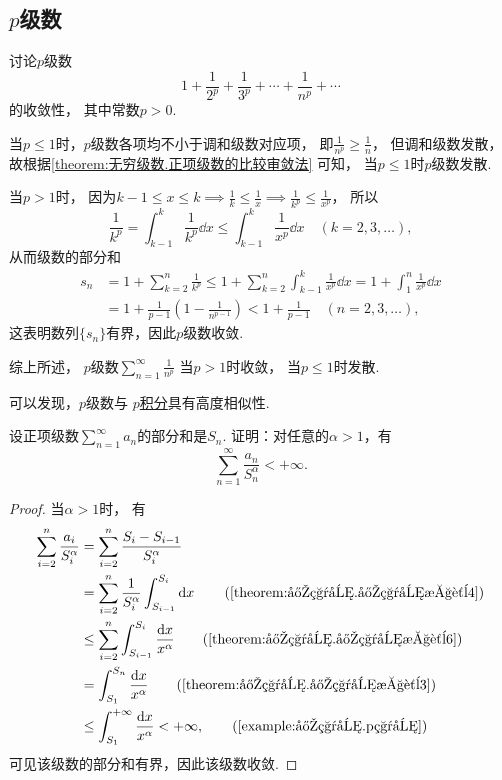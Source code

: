 \subsection{\texorpdfstring{\(p\)}{p}级数}
\begin{proposition}\label{example:无穷级数.p级数的收敛性}
讨论\(p\)级数\[
	1+\frac{1}{2^p}+\frac{1}{3^p}+\dotsb+\frac{1}{n^p}+\dotsb
\]的收敛性，
其中常数\(p>0\).
\begin{solution}
当\(p \leq 1\)时，\(p\)级数各项均不小于调和级数对应项，
即\(\frac{1}{n^p} \geq \frac{1}{n}\)，
但调和级数发散，
故根据\cref{theorem:无穷级数.正项级数的比较审敛法} 可知，
当\(p \leq 1\)时\(p\)级数发散.

当\(p > 1\)时，
因为\(k-1
\leq x
\leq k \implies \frac{1}{k}
\leq \frac{1}{x} \implies \frac{1}{k^p}
\leq \frac{1}{x^p}\)，
所以\[
	\frac{1}{k^p}
	= \int_{k-1}^k \frac{1}{k^p} \dd{x}
	\leq \int_{k-1}^k \frac{1}{x^p} \dd{x}
	\quad(k=2,3,\dotsc),
\]
从而级数的部分和
\begin{align*}
	s_n &= 1 + \sum_{k=2}^n{\frac{1}{k^p}}
	\leq 1 + \sum_{k=2}^n{ \int_{k-1}^k{\frac{1}{x^p}\dd{x}} }
	= 1 + \int_1^n{\frac{1}{x^p}\dd{x}} \\
	&= 1 + \frac{1}{p-1}\left(1-\frac{1}{n^{p-1}}\right)
	< 1 + \frac{1}{p-1}
	\quad(n=2,3,\dotsc),
\end{align*}
这表明数列\(\{s_n\}\)有界，因此\(p\)级数收敛.

综上所述，{\color{red} \(p\)级数\(\sum_{n=1}^\infty \frac{1}{n^p}\)
当\(p > 1\)时收敛，
当\(p \leq 1\)时发散.}
\end{solution}
\end{proposition}
可以发现，\(p\)级数与
\hyperref[example:定积分.p积分]{\(p\)积分}具有高度相似性.

\begin{example}
设正项级数\(\sum_{n=1}^\infty a_n\)的部分和是\(S_n\).
证明：对任意的\(\alpha>1\)，有\[
	\sum_{n=1}^\infty \frac{a_n}{S_n^\alpha} < +\infty.
\]
\begin{proof}
当\(\alpha>1\)时，
有\begin{align*}
	\sum_{i=2}^n \frac{a_i}{S_i^\alpha}
	&= \sum_{i=2}^n \frac{S_i-S_{i-1}}{S_i^\alpha} \\
	&= \sum_{i=2}^n \frac{1}{S_i^\alpha} \int_{S_{i-1}}^{S_i} \dd{x}
			\tag{\cref{theorem:定积分.定积分性质4}} \\
	&\leq \sum_{i=2}^n \int_{S_{i-1}}^{S_i} \frac{\dd{x}}{x^\alpha}
			\tag{\cref{theorem:定积分.定积分性质6}} \\
	&= \int_{S_1}^{S_n} \frac{\dd{x}}{x^\alpha}
			\tag{\cref{theorem:定积分.定积分性质3}} \\
	&\leq \int_{S_1}^{+\infty} \frac{\dd{x}}{x^\alpha}
	< +\infty,
			\tag{\cref{example:定积分.p积分}}
\end{align*}
可见该级数的部分和有界，因此该级数收敛.
\end{proof}
\end{example}

